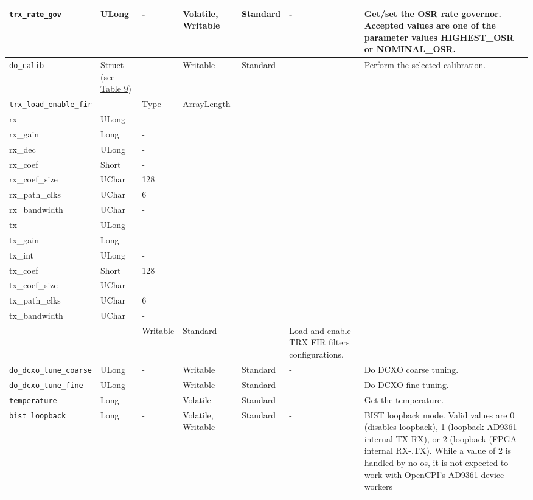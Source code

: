 \documentclass{article}
\begin{document}
\begin{landscape}
\begin{scriptsize}
\begin{longtable}{|p{3.6cm}|p{8.1cm}|p{1.4cm}|p{1.3cm}|p{1.4cm}|p{2.5cm}|p{3.6cm}|}
			\hline
			\verb+trx_rate_gov+ & ULong & - & Volatile, Writable & Standard & - & Get/set the OSR rate governor. Accepted values are one of the parameter values HIGHEST\_OSR or NOMINAL\_OSR. \\
			\hline
			\verb+do_calib+ & Struct (see \hyperlink{tab9}{Table 9})  & - & Writable & Standard & - & Perform the selected calibration. \\
			\hline
			\verb+trx_load_enable_fir+ & \begin{tabular}{|p{2.2cm}|p{2.7cm}|p{1.7cm}|} \hline \cellcolor{blue} Name & \cellcolor{blue}Type & \cellcolor{blue} ArrayLength \\ \hline rx & ULong & - \\ \hline rx\_gain & Long & - \\ \hline rx\_dec & ULong & - \\ \hline rx\_coef & Short & - \\ \hline rx\_coef\_size & UChar & 128 \\ \hline rx\_path\_clks & UChar & 6 \\ \hline rx\_bandwidth & UChar & - \\ \hline tx & ULong & - \\ \hline tx\_gain & Long & - \\ \hline tx\_int & ULong & - \\ \hline tx\_coef & Short & 128 \\ \hline tx\_coef\_size & UChar & - \\ \hline tx\_path\_clks & UChar & 6 \\ \hline tx\_bandwidth & UChar & - \\ \hline\end{tabular} & - & Writable & Standard & - & Load and enable TRX FIR filters configurations. \\
			\hline
			\verb+do_dcxo_tune_coarse+ & ULong & - & Writable & Standard & - & Do DCXO coarse tuning.\\
			\hline
			\verb+do_dcxo_tune_fine+ & ULong & - & Writable & Standard & - & Do DCXO fine tuning. \\
			\hline
			\verb+temperature+ & Long & - & Volatile & Standard & - & Get the temperature. \\
			\hline
			\verb+bist_loopback+ & Long & - & Volatile, Writable & Standard & - & BIST loopback mode. Valid values are 0 (disables loopback), 1 (loopback AD9361 internal TX-RX), or 2 (loopback (FPGA internal RX-.TX). While a value of 2 is handled by no-os, it is not expected to work with OpenCPI's AD9361 device workers \\

\end{longtable}
\end{scriptsize}
\end{landscape}
\end{document}
